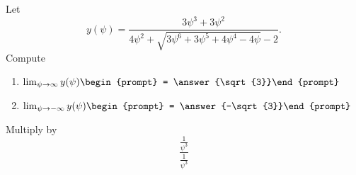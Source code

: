 \documentclass{ximera}
\author{Bart Snapp}
\begin{document}
\begin{exercise}
Let 
\[
y(\psi) = \frac{3 \psi ^3+3 \psi ^2}{4 \psi ^2+\sqrt{3 \psi ^6+3 \psi ^5+4 \psi ^4-4 \psi }-2}.
\]
Compute
\begin{enumerate}
\item $\lim_{\psi\to \infty} y(\psi) \begin{prompt} = \answer{\sqrt{3}}\end{prompt}$
\item $\lim_{\psi\to -\infty}y(\psi) \begin{prompt} = \answer{-\sqrt{3}}\end{prompt}$
\end{enumerate}
\begin{hint}
Multiply by
\[
\frac{\frac{1}{\psi ^3}}{\frac{1}{\psi ^3}}
\]
\end{hint}
\end{exercise}
\end{document}
